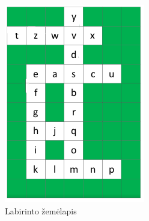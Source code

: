 \begin{figure}[H]
  \centering
  \includegraphics[]{content/map.png}
  \caption{Labirinto žemėlapis}
  \label{fig:fc:map}
\end{figure}

